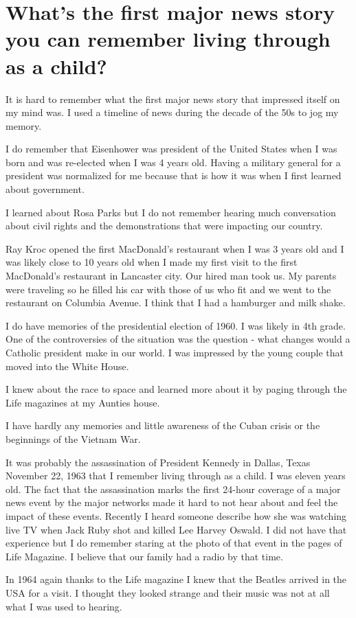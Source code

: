 \section{What's the first major news story you can remember living through as a child?}
It is hard to remember what the first major news story that impressed itself on my mind was.
I used a timeline of news during the decade of the 50s to jog my memory.

I do remember that Eisenhower was president of the United States when I was born and was re-elected when I was 4 years old.
Having a military general for a president was normalized for me because that is how it was when I first learned about government.

I learned about Rosa Parks but I do not remember hearing much conversation about civil rights and the demonstrations that were impacting our country.

Ray Kroc opened the first MacDonald's restaurant when I was 3 years old and I was likely close to 10 years old when I made my first visit to the first MacDonald's restaurant in Lancaster city.
Our hired man took us.
My parents were traveling so he filled his car with those of us who fit and we went to the restaurant on Columbia Avenue.
I think that I had a hamburger and milk shake.

I do have memories of the presidential election of 1960.
I was likely in 4th grade.
One of the controversies of the situation was the question - what changes would a Catholic president make in our world.
I was impressed by the young couple that moved into the White House.

I knew about the race to space and learned more about it by paging through the Life magazines at my Aunties house.

I have hardly any memories and little awareness of the Cuban crisis or the beginnings of the Vietnam War.

It was probably the assassination of President Kennedy in Dallas, Texas November 22, 1963 that I remember living through as a child.
I was eleven years old.
The fact that the assassination marks the first 24-hour coverage of a major news event by the major networks made it hard to not hear about and feel the impact of these events.
Recently I heard someone describe how she was watching live TV when Jack Ruby shot and killed Lee Harvey Oswald.
I did not have that experience but I do remember staring at the photo of that event in the pages of Life Magazine.
I believe that our family had a radio by that time.

In 1964 again thanks to the Life magazine I knew that the Beatles arrived in the USA for a visit.
I thought they looked strange and their music was not at all what I was used to hearing.






